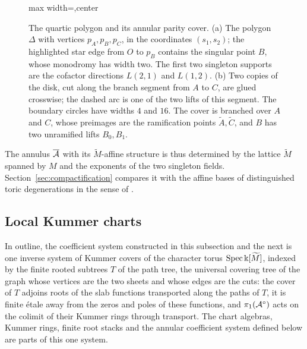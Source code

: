 \begin{figure}[t]
\centering
\vspace{0.5\baselineskip}
\begin{adjustbox}{max width=\textwidth,center}

\end{adjustbox}
\caption{The quartic polygon and its annular parity cover.  (a) The polygon
$\Delta$ with vertices $p_A,p_B,p_C$, in the coordinates $(s_1,s_2)$; the
highlighted star edge from $O$ to $p_B$ contains the singular point $B$,
whose monodromy has width two.  The first two singleton supports are the
cofactor directions $L(2,1)$ and $L(1,2)$.  (b) Two copies of the disk, cut
along the branch segment from $A$ to $C$, are glued crosswise; the dashed
arc is one of the two lifts of this segment.  The boundary circles have
widths $4$ and $16$.  The cover is branched over $A$ and $C$, whose
preimages are the ramification points $\widetilde A,\widetilde C$, and $B$ has two
unramified lifts $B_0,B_1$.}
\label{fig:annular-cover}
\end{figure}

The annulus $\overline{\mathcal A}$ with its $\widetilde M$-affine structure is thus
determined by the lattice $\widetilde M$ spanned by $M$ and the exponents of
the two singleton fields.
Section~\ref{sec:compactification} compares it with the affine bases of
distinguished toric degenerations in the sense of \cite{carletal2024}.

\subsection{Local Kummer charts}
\label{subsec:kummer-charts}

In outline, the coefficient system constructed in this subsection and the
next is one inverse system of Kummer covers of the character torus
$\operatorname{Spec}\Bbbk[\widetilde M]$, indexed by the finite rooted subtrees $T$ of the
path tree, the universal covering tree of the graph whose vertices are the
two sheets and whose edges are the cuts: the cover of $T$ adjoins roots of
the slab functions transported along the paths of $T$, it is finite \'etale
away from the zeros and poles of these functions, and
$\pi_1(\mathcal A^\circ)$ acts on the colimit of their Kummer rings through
transport.  The chart algebras, Kummer rings, finite root stacks and the
annular coefficient system defined below are parts of this one system.


